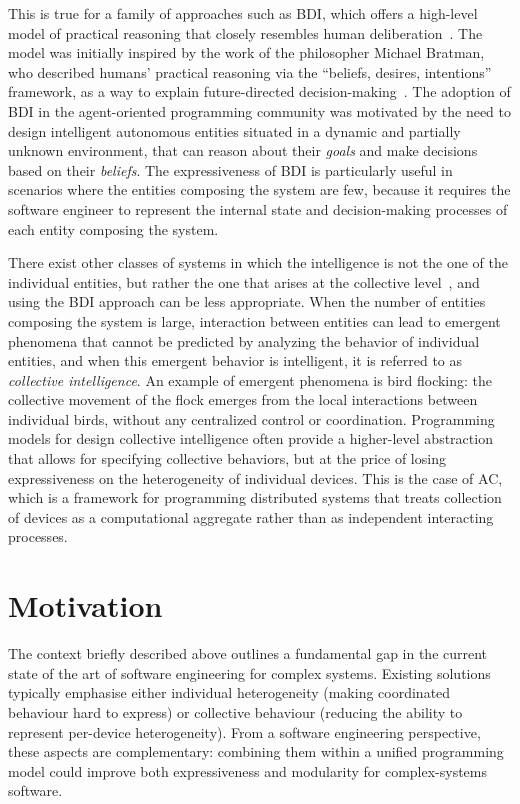 \documentclass[12pt,a4paper,openright,twoside]{book}
\begin{document}
%
This is true for a family of approaches such as \ac{BDI}, 
which offers a high-level model of practical reasoning 
that closely resembles human deliberation~\cite{rao1996maamaw}. 
%
The model was initially inspired by the work of the philosopher Michael Bratman,
who described humans' practical reasoning via the ``beliefs, desires, intentions'' framework,
as a way to explain future-directed decision-making~\cite{bratman1987intention}.
%
The adoption of \ac{BDI} in the agent-oriented programming community 
was motivated by the need to design intelligent autonomous entities situated in a dynamic and partially unknown environment,
that can reason about their \emph{goals} and make decisions based on their \emph{beliefs}.
%
The expressiveness of \ac{BDI} is particularly useful in scenarios where the entities composing the system are few,
because it requires the software engineer to represent the internal state and decision-making processes of each entity composing the system.

There exist other classes of systems in which the intelligence is not the one of the individual entities, 
but rather the one that arises at the collective level~\cite{DBLP:conf/saso/CasadeiV18}, 
and using the \ac{BDI} approach can be less appropriate.
%
When the number of entities composing the system is large,
interaction between entities can lead to emergent phenomena that cannot be predicted by analyzing the behavior of individual entities,
and when this emergent behavior is intelligent, 
it is referred to as \emph{collective intelligence}.
%
An example of emergent phenomena is bird flocking:  
the collective movement of the flock emerges from 
the local interactions between individual birds, 
without any centralized control or coordination.
%
Programming models for design collective intelligence
often provide a higher-level abstraction that allows for specifying collective behaviors, 
but at the price of losing expressiveness on the heterogeneity of individual devices.
%
This is the case of \ac{AC}, 
which is a framework for programming distributed systems
that treats collection of devices as a computational aggregate 
rather than as independent interacting processes.

\section{Motivation}

The context briefly described above
outlines a fundamental gap in the current state of the art of software engineering for complex systems.
%
Existing solutions typically emphasise either individual heterogeneity 
(making coordinated behaviour hard to express) 
or collective behaviour 
(reducing the ability to represent per-device heterogeneity). 
%
From a software engineering perspective, 
these aspects are complementary: 
combining them within a unified programming model 
could improve both expressiveness and modularity for complex-systems software.
\end{document}
